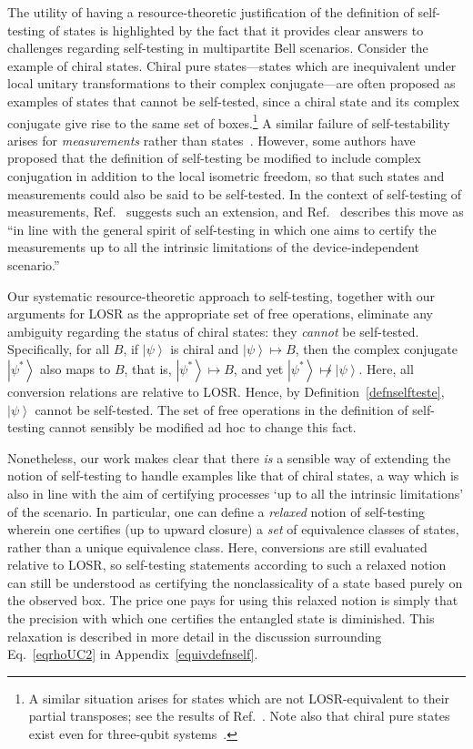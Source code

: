 \documentclass[prx,11pt,letterpaper,twocolumn,accepted=2023-11-27]{quantumarticle}
\newcommand{\ket}[1]{\left| #1 \right>}
\theoremstyle{plain}
\theoremstyle{definition}
\begin{document}
The utility of having a resource-theoretic
 justification of the definition of self-testing of states
is highlighted by the fact that it provides clear answers to challenges regarding self-testing in multipartite Bell scenarios. Consider the example of chiral states.
Chiral pure states---states which are inequivalent under local unitary transformations to their complex conjugate---are often proposed as examples of states that cannot be self-tested, since a chiral state and its complex conjugate give rise to the same set of boxes.\footnote{A similar situation arises for states which are not LOSR-equivalent to their partial transposes; see the results of Ref.~\cite{Hiraxh2020PPT}. Note also that chiral pure states exist even for three-qubit systems~\cite{Acin2000triclassify,Acin2001puretriclassify}.} A similar failure of self-testability arises for {\em measurements} rather than states~\cite{mckague2010generalized}.
However, some authors have proposed that the definition of self-testing be modified to include complex conjugation in addition to the  local isometric freedom, so that such states and measurements could also be said to be self-tested. In the context of self-testing of measurements, Ref.~\cite{mckague2010generalized} suggests such an extension, and Ref.~\cite{vsupic2020self} describes this move as ``in line with the general spirit of self-testing in which one aims to certify the measurements up to all the intrinsic limitations of the device-independent scenario.''  

Our systematic resource-theoretic approach to self-testing, together with our arguments for LOSR as the appropriate set of free operations, eliminate any ambiguity regarding the status of chiral states: they {\em cannot} be self-tested.  Specifically, for all $B$, if $\ket \psi$ is chiral and $\ket{\psi} \mapsto B $, then the complex conjugate $\ket{\psi^*}$ also maps to $B$, that is, $\ket{\psi^*} \mapsto B $, and yet $\ket{\psi^*} \not\mapsto \ket{\psi}$.  Here, all conversion relations are relative to LOSR. Hence, by Definition~\ref{defnselfteste}, $\ket{\psi}$ cannot be self-tested. The set of free operations in the definition of self-testing cannot sensibly be modified ad hoc to change this fact.

Nonetheless, our work makes clear that there {\em is} a sensible way of extending the notion of self-testing to handle examples like that of chiral states, a way which is also in line with the aim of certifying processes `up to all the intrinsic limitations' of the scenario. In particular, one can define a {\em relaxed} notion of self-testing wherein one certifies (up to upward closure) a {\em set} of equivalence classes of states, rather than a unique equivalence class. Here, conversions are still evaluated relative to LOSR, so self-testing statements according to such a relaxed notion can still be understood as certifying the nonclassicality of a state based purely on the observed box. The price one pays for using this relaxed notion is simply that the precision with which one certifies the entangled state is diminished. This relaxation is described in more detail in the discussion surrounding Eq.~\eqref{eqrhoUC2} in Appendix~\ref{equivdefnself}.
\end{document}
